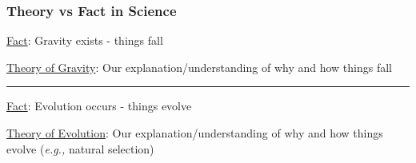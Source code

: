 \documentclass[10pt]{beamer}
\begin{document}
\begin{frame}[t]
\frametitle{Theory vs Fact in Science}
\vspace{0.5cm}

	\textcolor{myblue}{\underline{Fact}:} Gravity exists - things fall\\
	
	\vspace{0.25cm}
	
	\textcolor{myblue}{\underline{Theory of Gravity}:} Our explanation/understanding of why and how things fall\\
	
		\begin{center}
			\rule{0.3\textwidth}{0.5pt}
		\end{center}
		
	\vspace{0.5cm}
	
	\textcolor{myblue}{\underline{Fact}:} Evolution occurs - things evolve\\
	
	\vspace{0.25cm}
	
	\textcolor{myblue}{\underline{Theory of Evolution}:} Our explanation/understanding of why and how things evolve (\emph{e.g.,} natural selection)\\
\end{frame}
\end{document}
